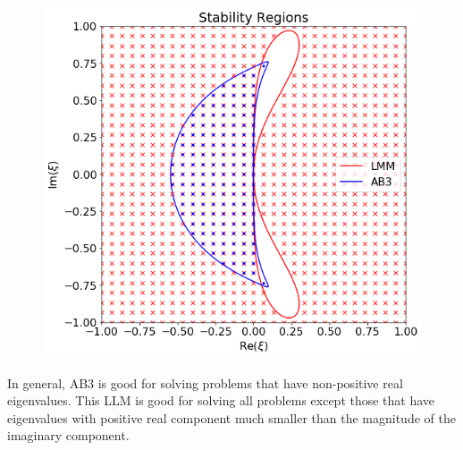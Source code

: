 \documentclass[final,oneside,onecolumn]{article}
\begin{document}
\begin{enumerate}
\begin{figure}[H]
	\centering
	\includegraphics[width=.6\linewidth]{hw5_p4b_true_region}
\end{figure}

In general, AB3 is good for solving problems that have non-positive real eigenvalues. This LLM is good for solving all problems except those that have eigenvalues with positive real component much smaller than the magnitude of the imaginary component. 

\end{enumerate}


\end{document}
